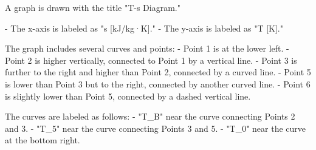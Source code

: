 A graph is drawn with the title "T-s Diagram."  

- The x-axis is labeled as "s [kJ/kg·K]."  
- The y-axis is labeled as "T [K]."  

The graph includes several curves and points:  
- Point 1 is at the lower left.  
- Point 2 is higher vertically, connected to Point 1 by a vertical line.  
- Point 3 is further to the right and higher than Point 2, connected by a curved line.  
- Point 5 is lower than Point 3 but to the right, connected by another curved line.  
- Point 6 is slightly lower than Point 5, connected by a dashed vertical line.  

The curves are labeled as follows:  
- "T_B" near the curve connecting Points 2 and 3.  
- "T_5" near the curve connecting Points 3 and 5.  
- "T_0" near the curve at the bottom right.